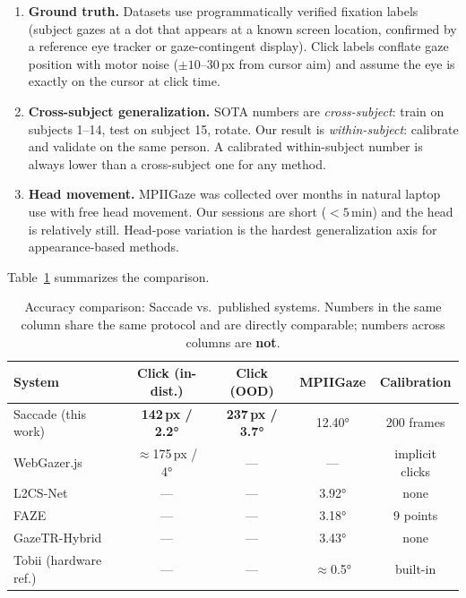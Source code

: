 \documentclass[11pt,a4paper]{article}
\begin{document}
\begin{enumerate}
  \item \textbf{Ground truth.} Datasets use programmatically verified fixation labels (subject gazes at a dot that appears at a known screen location, confirmed by a reference eye tracker or gaze-contingent display). Click labels conflate gaze position with motor noise ($\pm 10$--$30$\,px from cursor aim) and assume the eye is exactly on the cursor at click time.

  \item \textbf{Cross-subject generalization.} SOTA numbers are \textit{cross-subject}: train on subjects 1--14, test on subject 15, rotate. Our result is \textit{within-subject}: calibrate and validate on the same person. A calibrated within-subject number is always lower than a cross-subject one for any method.

  \item \textbf{Head movement.} MPIIGaze was collected over months in natural laptop use with free head movement. Our sessions are short ($<5$\,min) and the head is relatively still. Head-pose variation is the hardest generalization axis for appearance-based methods.
\end{enumerate}

Table~\ref{tab:eval_comparison} summarizes the comparison.

\begin{table}[H]
\centering
\caption{Accuracy comparison: Saccade vs.\ published systems. Numbers in the same column share the same protocol and are directly comparable; numbers across columns are \textbf{not}.}
\label{tab:eval_comparison}
\begin{tabular}{lcccc}
\toprule
\textbf{System} & \textbf{Click (in-dist.)} & \textbf{Click (OOD)} & \textbf{MPIIGaze} & \textbf{Calibration} \\
\midrule
Saccade (this work) & \textbf{142\,px / 2.2°} & \textbf{237\,px / 3.7°} & 12.40° & 200 frames \\
WebGazer.js~\cite{papoutsaki2016webgazer} & $\approx$175\,px / 4° & — & — & implicit clicks \\
L2CS-Net~\cite{abdelrahman2022l2cs} & — & — & 3.92° & none \\
FAZE~\cite{park2019faze} & — & — & 3.18° & 9 points \\
GazeTR-Hybrid~\cite{cheng2022gazetr} & — & — & 3.43° & none \\
Tobii (hardware ref.) & — & — & $\approx$0.5° & built-in \\
\bottomrule
\end{tabular}
\end{table}
\end{document}
